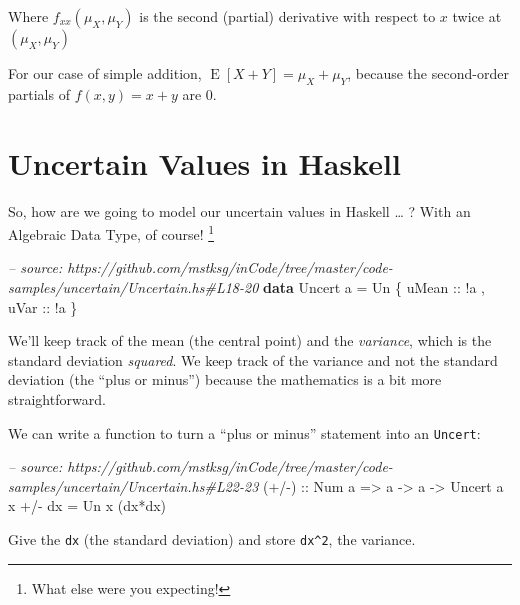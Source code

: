 \documentclass[]{article}
\newenvironment{Shaded}{}{}
\newcommand{\KeywordTok}[1]{\textcolor[rgb]{0.00,0.44,0.13}{\textbf{{#1}}}}
\newcommand{\DataTypeTok}[1]{\textcolor[rgb]{0.56,0.13,0.00}{{#1}}}
\newcommand{\CommentTok}[1]{\textcolor[rgb]{0.38,0.63,0.69}{\textit{{#1}}}}
\newcommand{\OtherTok}[1]{\textcolor[rgb]{0.00,0.44,0.13}{{#1}}}
\newcommand{\FunctionTok}[1]{\textcolor[rgb]{0.02,0.16,0.49}{{#1}}}
\newcommand{\NormalTok}[1]{{#1}}
\begin{document}
Where \(f_{xx}(\mu_X, \mu_Y)\) is the second (partial) derivative with
respect to \(x\) twice at \((\mu_X, \mu_Y)\)

For our case of simple addition,
\(\operatorname{E}[X + Y] = \mu_X + \mu_Y\), because the second-order
partials of \(f(x,y) = x + y\) are 0.

\section{Uncertain Values in Haskell}\label{uncertain-values-in-haskell}

So, how are we going to model our uncertain values in Haskell \ldots{} ?
With an Algebraic Data Type, of course! \footnote{What else were you
  expecting!}

\begin{Shaded}
\begin{Highlighting}[]
\CommentTok{-- source: https://github.com/mstksg/inCode/tree/master/code-samples/uncertain/Uncertain.hs#L18-20}
\KeywordTok{data} \DataTypeTok{Uncert} \NormalTok{a }\FunctionTok{=} \DataTypeTok{Un} \NormalTok{\{}\OtherTok{ uMean ::} \FunctionTok{!}\NormalTok{a}
                   \NormalTok{,}\OtherTok{ uVar  ::} \FunctionTok{!}\NormalTok{a}
                   \NormalTok{\}}
\end{Highlighting}
\end{Shaded}

We'll keep track of the mean (the central point) and the
\emph{variance}, which is the standard deviation \emph{squared}. We keep
track of the variance and not the standard deviation (the ``plus or
minus'') because the mathematics is a bit more straightforward.

We can write a function to turn a ``plus or minus'' statement into an
\texttt{Uncert}:

\begin{Shaded}
\begin{Highlighting}[]
\CommentTok{-- source: https://github.com/mstksg/inCode/tree/master/code-samples/uncertain/Uncertain.hs#L22-23}
\OtherTok{(+/-) ::} \DataTypeTok{Num} \NormalTok{a }\OtherTok{=>} \NormalTok{a }\OtherTok{->} \NormalTok{a }\OtherTok{->} \DataTypeTok{Uncert} \NormalTok{a}
\NormalTok{x }\FunctionTok{+/-} \NormalTok{dx }\FunctionTok{=} \DataTypeTok{Un} \NormalTok{x (dx}\FunctionTok{*}\NormalTok{dx)}
\end{Highlighting}
\end{Shaded}

Give the \texttt{dx} (the standard deviation) and store
\texttt{dx\^{}2}, the variance.
\end{document}
